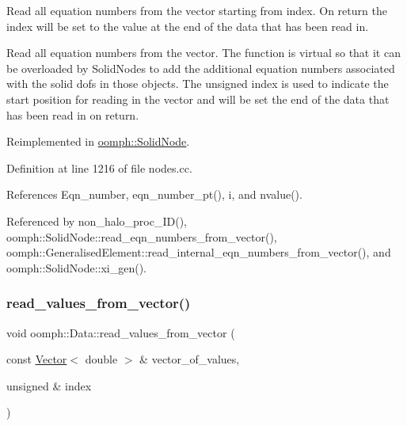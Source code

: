 Read all equation numbers from the vector starting from index. On return the index will be set to the value at the end of the data that has been read in. 

Read all equation numbers from the vector. The function is virtual so that it can be overloaded by Solid\+Nodes to add the additional equation numbers associated with the solid dofs in those objects. The unsigned index is used to indicate the start position for reading in the vector and will be set the end of the data that has been read in on return. 

Reimplemented in \hyperlink{classoomph_1_1SolidNode_a38bede9e51c7d6355969db2bc075f476}{oomph\+::\+Solid\+Node}.



Definition at line 1216 of file nodes.\+cc.



References Eqn\+\_\+number, eqn\+\_\+number\+\_\+pt(), i, and nvalue().



Referenced by non\+\_\+halo\+\_\+proc\+\_\+\+I\+D(), oomph\+::\+Solid\+Node\+::read\+\_\+eqn\+\_\+numbers\+\_\+from\+\_\+vector(), oomph\+::\+Generalised\+Element\+::read\+\_\+internal\+\_\+eqn\+\_\+numbers\+\_\+from\+\_\+vector(), and oomph\+::\+Solid\+Node\+::xi\+\_\+gen().

\mbox{\label{classoomph_1_1Data_a6b8bc02debd1bce8e1bfc68cd9a54695}} 
\subsubsection{\texorpdfstring{read\+\_\+values\+\_\+from\+\_\+vector()}{read\_values\_from\_vector()}}
{\footnotesize\ttfamily void oomph\+::\+Data\+::read\+\_\+values\+\_\+from\+\_\+vector (\begin{DoxyParamCaption}\item[{const \hyperlink{classoomph_1_1Vector}{Vector}$<$ double $>$ \&}]{vector\+\_\+of\+\_\+values,  }\item[{unsigned \&}]{index }\end{DoxyParamCaption})\hspace{0.3cm}{\ttfamily [virtual]}}



